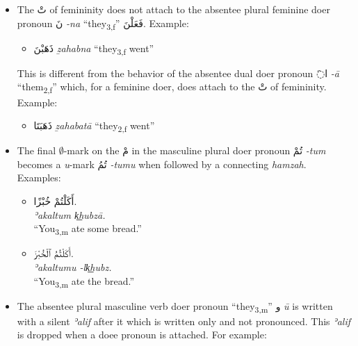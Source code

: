 \documentclass[
  10pt,
]{book}
\providecommand{\tightlist}{%
  \setlength{\itemsep}{0pt}\setlength{\parskip}{0pt}}
\begin{document}
\begin{itemize}
\item
  The \foreignlanguage{arabic}{تْ} of femininity does not attach to the absentee plural feminine doer pronoun \foreignlanguage{arabic}{نَ} \emph{-na} \enquote{they\textsubscript{3,f}} \foreignlanguage{arabic}{فَعَلْنَ}. Example:

  \begin{itemize}
  \tightlist
  \item
    \foreignlanguage{arabic}{ذَهَبْنَ} \emph{ẕahabna} \enquote{they\textsubscript{3,f} went}
  \end{itemize}

  This is different from the behavior of the absentee dual doer pronoun \foreignlanguage{arabic}{◌َا} \emph{-ā} \enquote{them\textsubscript{2,f}} which, for a feminine doer, does attach to the \foreignlanguage{arabic}{تْ} of femininity. Example:

  \begin{itemize}
  \tightlist
  \item
    \foreignlanguage{arabic}{ذَهَبَتَا} \emph{ẕahabatā} \enquote{they\textsubscript{2,f} went}
  \end{itemize}
\item
  The final \(\emptyset\)-mark on the \foreignlanguage{arabic}{مْ} in the masculine plural doer pronoun \foreignlanguage{arabic}{تُمْ} \emph{-tum} becomes a \emph{u}-mark \foreignlanguage{arabic}{تُمُ} \emph{-tumu} when followed by a connecting \emph{hamzah}. Examples:

  \begin{itemize}
  \tightlist
  \item
    \foreignlanguage{arabic}{أَکَلْتُمْ خُبْزًا.}\\
    \emph{ʾakaltum k͟hubzā.}\\
    \enquote{You\textsubscript{3,m} ate some bread.}
  \item
    \foreignlanguage{arabic}{أَکَلْتُمُ ٱلْخُبْزَ.}\\
    \emph{ʾakaltumu -lk͟hubz.}\\
    \enquote{You\textsubscript{3,m} ate the bread.}
  \end{itemize}
\item
  The absentee plural masculine verb doer pronoun \enquote{they\textsubscript{3,m}} \foreignlanguage{arabic}{و} \emph{ū} is written with a silent \emph{ʾalif} after it which is written only and not pronounced. This \emph{ʾalif} is dropped when a doee pronoun is attached. For example:


\end{itemize}
\end{document}
